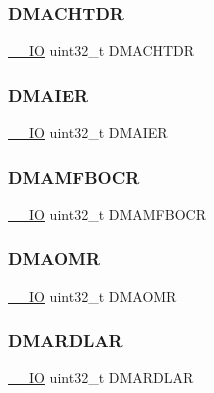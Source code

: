 \subsubsection{\texorpdfstring{DMACHTDR}{DMACHTDR}}
{\footnotesize\ttfamily \mbox{\hyperlink{core__sc300_8h_aec43007d9998a0a0e01faede4133d6be}{\+\_\+\+\_\+\+IO}} uint32\+\_\+t D\+M\+A\+C\+H\+T\+DR}

\mbox{\label{struct_e_t_h___type_def_add56f3652fd065c6797411e80477a064}} 
\subsubsection{\texorpdfstring{DMAIER}{DMAIER}}
{\footnotesize\ttfamily \mbox{\hyperlink{core__sc300_8h_aec43007d9998a0a0e01faede4133d6be}{\+\_\+\+\_\+\+IO}} uint32\+\_\+t D\+M\+A\+I\+ER}

\mbox{\label{struct_e_t_h___type_def_a12eba1fc5d54aa50fdda201f7f9a84a3}} 
\subsubsection{\texorpdfstring{DMAMFBOCR}{DMAMFBOCR}}
{\footnotesize\ttfamily \mbox{\hyperlink{core__sc300_8h_aec43007d9998a0a0e01faede4133d6be}{\+\_\+\+\_\+\+IO}} uint32\+\_\+t D\+M\+A\+M\+F\+B\+O\+CR}

\mbox{\label{struct_e_t_h___type_def_aa15b972f30ee47f5df0d3ebc8866509d}} 
\subsubsection{\texorpdfstring{DMAOMR}{DMAOMR}}
{\footnotesize\ttfamily \mbox{\hyperlink{core__sc300_8h_aec43007d9998a0a0e01faede4133d6be}{\+\_\+\+\_\+\+IO}} uint32\+\_\+t D\+M\+A\+O\+MR}

\mbox{\label{struct_e_t_h___type_def_a581ce491c035ce46db723260377c2032}} 
\subsubsection{\texorpdfstring{DMARDLAR}{DMARDLAR}}
{\footnotesize\ttfamily \mbox{\hyperlink{core__sc300_8h_aec43007d9998a0a0e01faede4133d6be}{\+\_\+\+\_\+\+IO}} uint32\+\_\+t D\+M\+A\+R\+D\+L\+AR}

